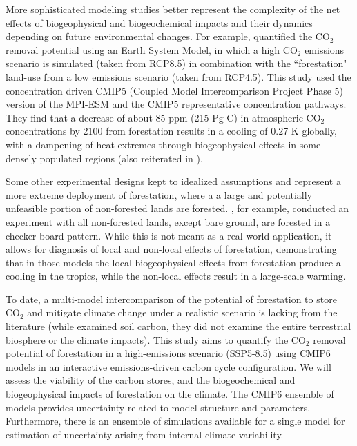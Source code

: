 \documentclass[draft]{agujournal2019}
\begin{document}
More sophisticated modeling studies better represent the complexity of the net effects of biogeophysical and biogeochemical impacts and their dynamics depending on future environmental changes.
For example,  quantified the CO$_2$ removal potential using an Earth System Model, in which a high CO$_2$ emissions scenario is simulated (taken from RCP8.5) in combination with the ``forestation" land-use from a low emissions scenario (taken from RCP4.5).
This study used the concentration driven CMIP5 (Coupled Model Intercomparison Project Phase 5) version of the MPI-ESM and the CMIP5 representative concentration pathways.
They find that a decrease of about 85 ppm (215 Pg C) in atmospheric CO$_2$ concentrations by 2100 from forestation results in a cooling of 0.27 K globally, with a dampening of heat extremes through biogeophysical effects in some densely populated regions (also reiterated in ).

Some other experimental designs kept to idealized assumptions and represent a more extreme deployment of forestation, where a a large and potentially unfeasible portion of non-forested lands are forested.
, for example, conducted an experiment with all non-forested lands, except bare ground, are forested in a checker-board pattern.
While this is not meant as a real-world application, it allows for diagnosis of local and non-local effects of forestation, demonstrating that in those models the local biogeophysical effects from forestation produce a cooling in the tropics, while the non-local effects result in a large-scale warming.

To date, a multi-model intercomparison of the potential of forestation to store CO$_2$ and mitigate climate change under a realistic scenario is lacking from the literature (while  examined soil carbon, they did not examine the entire terrestrial biosphere or the climate impacts).
This study aims to quantify the CO$_2$ removal potential of forestation  in a high-emissions scenario (SSP5-8.5) using CMIP6 models in an interactive emissions-driven carbon cycle configuration.
We will assess the viability of the carbon stores, and the biogeochemical and biogeophysical impacts of forestation on the climate.
The CMIP6 ensemble of models provides uncertainty related to model structure and parameters.
Furthermore, there is an ensemble of simulations available for a single model for estimation of uncertainty arising from internal climate variability. 
\end{document}
